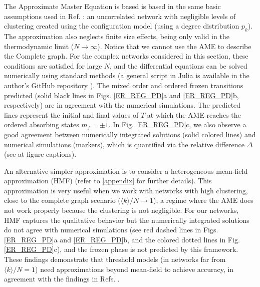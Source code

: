	The Approximate Master Equation is based is based in the same basic assumptions used in Ref. \cite{gleeson-2013}: an uncorrelated network with negligible levels of clustering created using the configuration model \cite{newman-2001} (using a degree distribution $p_k$). The approximation also neglects finite size effects, being only valid in the thermodynamic limit ($N \to \infty$). Notice that we cannot use the AME to describe the Complete graph. For the complex networks considered in this section, these conditions are satisfied for large $N$, and the differential equations can be solved numerically using standard methods (a general script in Julia is available in the author's GitHub repository \cite{link_git}). The mixed order and ordered frozen transitions predicted (solid black lines in Figs. \ref{ER_REG_PD}a and \ref{ER_REG_PD}b, respectively) are in agreement with the numerical simulations. The predicted lines represent the initial and final values of $T$ at which the AME reaches the ordered absorbing states $m_f = \pm 1$. In Fig. \ref{ER_REG_PD}c, we also observe a good agreement between numerically integrated solutions (solid colored lines) and numerical simulations (markers), which is quantified via the relative difference $\Delta$ (see at figure captions).
	
	An alternative simpler approximation is to consider a heterogeneous mean-field approximation (HMF) (refer to \ref{appendix} for further details). This approximation is very useful when we work with networks with high clustering, close to the complete graph scenario ($\langle k \rangle /N \to 1$), a regime where the AME does not work properly because the clustering is not negligible. For our networks, HMF captures the qualitative behavior but the numerically integrated solutions do not agree with numerical simulations (see red dashed lines in Figs. \ref{ER_REG_PD}a and \ref{ER_REG_PD}b, and the colored dotted lines in Fig. \ref{ER_REG_PD}c), and the frozen phase is not predicted by this framework. These findings demonstrate that threshold models (in networks far from $\langle k \rangle/N = 1$) need approximations beyond mean-field to achieve accuracy, in agreement with the findings in Refs. \cite{gleeson-2007,gleeson-2013,Abella-2022-AME}.
	
